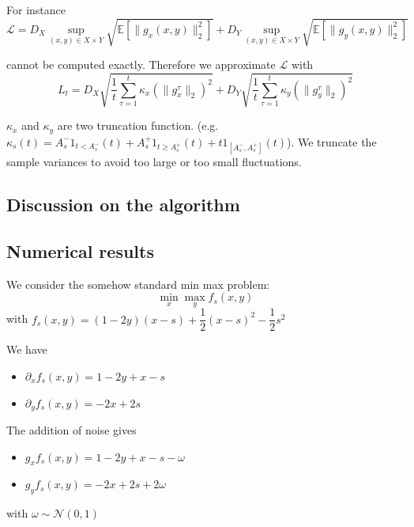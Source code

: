 \documentclass[12pt,reqno]{amsart}
\numberwithin{equation}{section}
\begin{document}
For instance
$$
\mathcal{L} = D_{X} \sup_{(x,y) \in X \times Y} \sqrt{\mathbb{E}[\lVert g_{x}(x,y) \rVert_{2}^{2}]} + 
D_{Y} \sup_{(x,y) \in X \times Y} \sqrt{\mathbb{E}[\lVert g_{y}(x,y) \rVert_{2}^{2}]}
$$

cannot be computed exactly.
Therefore we approximate $\mathcal{L}$ with  
$$
L_{t} = D_{X}\sqrt{\dfrac{1}{t}\sum_{\tau=1}^{t}\kappa_{x}(\lVert g_{x}^{\tau} \rVert_{2})^{2}} + D_{Y}\sqrt{\dfrac{1}{t}\sum_{\tau=1}^{t}  \kappa_{y}(\lVert g_{y}^{\tau} \rVert_{2})^{2}}
$$

$\kappa_{x}$ and $\kappa_{y}$ are two truncation function.
(e.g. $\kappa_{s}(t) = A_{s}^{-}1_{ t < A_{s}^{-}}(t) + A_{s}^{+}1_{ t \geq A_{s}^{+}}(t) + t 1_{ [A_{s}^{-}, A_{s}^{+}]}(t)$).
We truncate the sample variances to avoid too large or too small fluctuations.
%
%

\subsection{Discussion on the algorithm}

\subsection{Numerical results}

We consider the somehow standard min max problem:
$$
\min_{x}\max_{y} f_{s}(x,y)
$$
with $f_{s}(x,y) = (1 - 2y)(x - s) + \dfrac{1}{2}(x - s)^{2} - \dfrac{1}{2}s^{2} $

We have 

\begin{itemize}
\item $\partial_{x} f_{s}(x,y) = 1 - 2y + x - s$
\item $\partial_{y} f_{s}(x,y) = -2x + 2s$
\end{itemize}

The addition of noise gives

\begin{itemize}
\item $g_{x} f_{s}(x,y) = 1 - 2y + x - s - \omega$
\item $g_{y} f_{s}(x,y) = -2x + 2s + 2\omega$
\end{itemize}

with $\omega \sim \mathcal{N}(0,1)$
\end{document}
